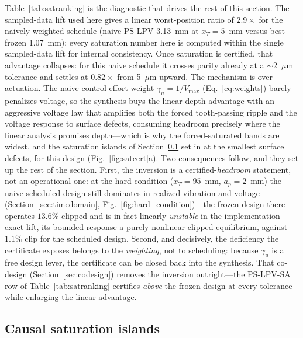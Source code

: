 \documentclass[preprint,12pt]{elsarticle}
\begin{document}
Table~\ref{tab:satranking} is the diagnostic that drives the rest of
this section. The sampled-data lift used here gives a linear
worst-position ratio of $2.9\times$ for the naively weighted schedule
(naive PS-LPV 3.13~mm at $x_T = 5$~mm versus best-frozen 1.07~mm);
every saturation number here is computed within the single sampled-data
lift for internal consistency.
Once saturation is certified, that advantage collapses:
for this naive schedule it crosses parity already at a $\sim$2~$\mu$m
tolerance and settles at $0.82\times$ from 5~$\mu$m
upward. The mechanism is over-actuation. The naive control-effort
weight $\gamma_u = 1/V_{\max}$ (Eq.~\eqref{eq:weights}) barely penalizes
voltage, so the synthesis buys the linear-depth advantage with an
aggressive voltage law that amplifies both the forced tooth-passing
ripple and the voltage response to surface defects, consuming headroom
precisely where the linear analysis promises depth---which is why the
forced-saturated bands are widest, and the saturation islands of
Section~\ref{sec:satisland} set in at the smallest surface defects, for
this design (Fig.~\ref{fig:satcert}a). Two consequences follow, and they
set up the rest of the section. First, the inversion is a
certified-\emph{headroom} statement, not an operational one: at the hard
condition ($x_T = 95$~mm, $a_p = 2$~mm) the naive scheduled design still
dominates in realized vibration and voltage
(Section~\ref{sec:timedomain}, Fig.~\ref{fig:hard_condition})---the
frozen design there operates $13.6\%$ clipped and is in fact linearly
\emph{unstable} in the implementation-exact lift, its bounded response a
purely nonlinear clipped equilibrium, against $1.1\%$ clip for the
scheduled design. Second, and decisively, the deficiency the certificate exposes
belongs to the \emph{weighting}, not to scheduling: because $\gamma_u$
is a free design lever, the certificate can be closed back into the
synthesis. That co-design (Section~\ref{sec:codesign}) removes the
inversion outright---the PS-LPV-SA row of
Table~\ref{tab:satranking} certifies \emph{above} the frozen design at
every tolerance while enlarging the linear advantage.

\subsection{Causal saturation islands}
\label{sec:satisland}
\end{document}

